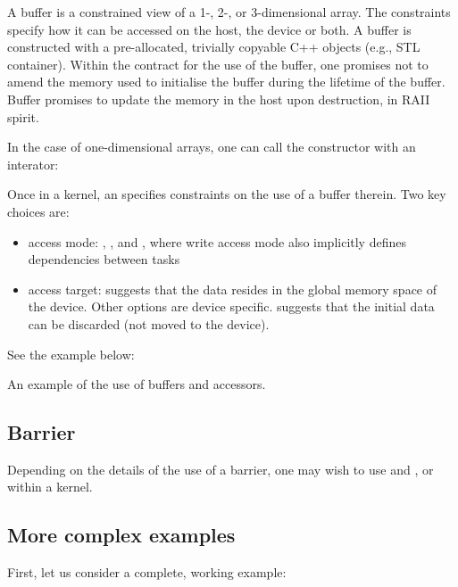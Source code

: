 A buffer is a constrained view of a 1-, 2-, or 3-dimensional array.
The constraints specify how it can be accessed on the host, the device or both. 
A buffer is constructed with a pre-allocated, trivially copyable C++ objects (e.g., STL container). 
Within the contract for the use of the buffer, 
one promises not to amend the memory used to initialise the buffer during the lifetime of the buffer. 
Buffer promises to update the memory in the host upon destruction, in RAII spirit. 

In the case of one-dimensional arrays, one can call the constructor with an interator:

Once in a kernel, an  specifies constraints on the use of a buffer therein. 
Two key choices are:
\begin{itemize}
\item access mode: , , and , where write access mode also implicitly defines dependencies between tasks
\item access target:  suggests that the data resides in the global memory space of the device. Other options are device specific.  suggests that the initial data can be discarded (not moved to the device). 
\end{itemize}

See the example below:
\raggedbottom
\begin{codebox}[]{\href{https://godbolt.org/z/h1qqdbeMd}{\ExternalLink}}
\footnotesize An example of the use of buffers and accessors.
\tcblower
{}
\end{codebox}

\subsection{Barrier}

Depending on the details of the use of a barrier, one may wish to use  and , or  within a kernel.


\subsection{More complex examples}

First, let us consider a complete, working example:

